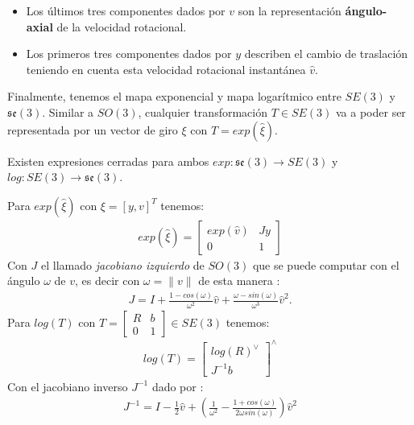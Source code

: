 \documentclass[ twoside,openright,titlepage,numbers=noenddot,%
                headinclude,footinclude,cleardoublepage=empty,abstract=on,
                BCOR=-5mm,paper=a4,fontsize=11pt
                ]{scrreprt}
\newcommand{\se}[1]{\mathfrak{se(#1)}}
\newcommand{\norm}[1]{\| #1 \|}
\begin{document}
\begin{itemize}
\item
  Los últimos tres componentes dados por \(v\) son la representación
  \textbf{ángulo-axial} de la velocidad rotacional.
\item
  Los primeros tres componentes dados por \(y\) describen el cambio de
  traslación teniendo en cuenta esta velocidad rotacional instantánea
  \(\hat{v}\).
\end{itemize}

\bigbreak

Finalmente, tenemos el mapa exponencial y mapa logarítmico entre
\(SE(3)\) y \(\se3\). Similar a \(SO(3)\), cualquier transformación
\(T \in SE(3)\) va a poder ser representada por un vector de giro
\(\xi\) con \(T = exp(\hat{\xi})\).

Existen expresiones cerradas para ambos \(exp : \se3 \rightarrow SE(3)\)
y \(log : SE(3) \rightarrow \se3\).

Para \(exp(\hat{\xi})\) con \(\xi = [y, v]^T\) tenemos: \begin{align}
exp(\hat{\xi}) = \begin{bmatrix}
exp(\hat{v}) & Jy \\
0 & 1
\end{bmatrix}
\end{align} Con \(J\) el llamado \emph{jacobiano izquierdo} de \(SO(3)\)
que se puede computar con el ángulo \(\omega\) de \(v\), es decir con
\(\omega = \norm{v}\) de esta manera
\autocite{eadeDerivativeExponentialMap}: \begin{align}
J = I + \frac{1-cos(\omega)}{\omega^2} \hat{v} + \frac{\omega -
sin(\omega)}{\omega^3} \hat{v}^2.
\end{align} Para \(log(T)\) con
\(T = \begin{bmatrix}R & b \\ 0 & 1\end{bmatrix}\in SE(3)\) tenemos:
\begin{align}
log(T) = \begin{bmatrix}log(R)^{\vee} \\ J^{-1}b\end{bmatrix}^{\wedge}
\end{align} Con el jacobiano inverso \(J^{-1}\) dado por
\autocite{eadeDerivativeExponentialMap}: \begin{align}
J^{-1} = I - \frac{1}{2} \hat{v} +
\left( \frac{1}{\omega^2} - \frac{1 + cos(\omega)}{2 \omega sin(\omega)} \right) \hat{v}^2
\end{align}
\end{document}
